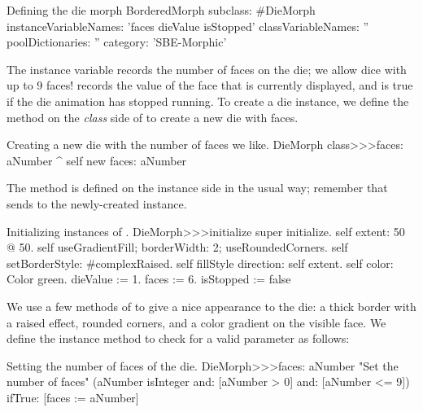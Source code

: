 \documentclass[a4paper,10pt,twoside]{book}
\begin{document}

\begin{classdef}{Defining the die morph}
BorderedMorph subclass: #DieMorph
	instanceVariableNames: 'faces dieValue isStopped'
	classVariableNames: ''
	poolDictionaries: ''
	category: 'SBE-Morphic'
\end{classdef}

The instance variable  records the number of faces on the die; we allow dice with up to 9 faces!  records the value of the face that is currently displayed, and  is true if the die animation has stopped running.
To create a die instance, we define the  method on the \emph{class} side of  to create a new die with  faces.
\begin{method}{Creating a new die with the number of faces we like.}
DieMorph class>>>faces: aNumber
	^ self new faces: aNumber
\end{method}

The  method is defined on the instance side in the usual way; remember that  sends  to the newly-created instance.
\begin{method}{Initializing instances of .}
DieMorph>>>initialize
	super initialize.
	self extent: 50 @ 50.
	self useGradientFill; borderWidth: 2; useRoundedCorners.
	self setBorderStyle: #complexRaised.
	self fillStyle direction: self extent.
	self color: Color green.
	dieValue := 1.
	faces := 6.
	isStopped := false
\end{method}

We use a few methods of  to give a nice appearance to the die: a thick border with a raised effect, rounded corners, and a color gradient on the visible face.
We define the instance method  to check for a valid parameter as follows:
\begin{method}{Setting the number of faces of the die.}
DieMorph>>>faces: aNumber
	"Set the number of faces"
	(aNumber isInteger
			and: [aNumber > 0]
			and: [aNumber <= 9])
		ifTrue: [faces := aNumber]
\end{method}
\end{document}
